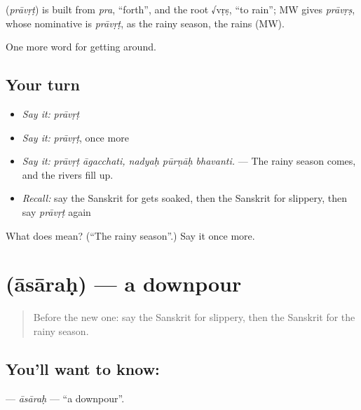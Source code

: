 \begin{cousinweb}
\textbf{} (\emph{prāvṛṭ}) is built from \emph{pra}, \textquotedblleft{}forth\textquotedblright{}, and the root √vṛṣ, \textquotedblleft{}to rain\textquotedblright{}; MW gives \emph{prāvṛṣ}, whose nominative is \emph{prāvṛṭ}, as the rainy season, the rains (MW).
\end{cousinweb}

\begin{grammarlens}[title={What you've built}]
One more word for getting around.
\end{grammarlens}

\subsection*{Your turn}
\begin{itemize}
\raggedright
  \item \emph{Say it:} \emph{prāvṛṭ}
  \item \emph{Say it:} \emph{prāvṛṭ}, once more
  \item \emph{Say it:} \emph{prāvṛṭ āgacchati, nadyaḥ pūrṇāḥ bhavanti.} — The rainy season comes, and the rivers fill up.
  \item \emph{Recall:} say the Sanskrit for gets soaked, then the Sanskrit for slippery, then say \emph{prāvṛṭ} again
\end{itemize}

\begin{tcolorbox}[breakable,colback=teal!4,colframe=teal!35!black,title={Before you move on}]
What does  mean? (\textquotedblleft{}The rainy season\textquotedblright{}.) Say it once more.
\end{tcolorbox}
\section[\texorpdfstring{\sk{आसारः} (āsāraḥ)}{आसारः (āsāraḥ)}]{ (āsāraḥ) — a downpour}

\label{lesson:SA-C437-asarah}



\begin{quote}
Before the new one: say the Sanskrit for slippery, then the Sanskrit for the rainy season.
\end{quote}

\subsection*{You'll want to know: }
\textbf{} — \emph{āsāraḥ} — \textquotedblleft{}a downpour\textquotedblright{}.

